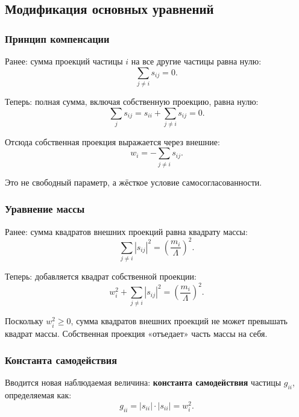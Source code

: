 \documentclass[12pt,a4paper]{article}
\begin{document}
\subsection{Модификация основных уравнений}

\subsubsection{Принцип компенсации}
Ранее: сумма проекций частицы $i$ на все другие частицы равна нулю:
\begin{equation}
    \sum_{j \neq i} s_{ij} = 0.
\end{equation}

Теперь: полная сумма, включая собственную проекцию, равна нулю:
\begin{equation}
    \sum_{j} s_{ij} = s_{ii} + \sum_{j \neq i} s_{ij} = 0.
\end{equation}

Отсюда собственная проекция выражается через внешние:
\begin{equation}
    \boxed{w_i = -\sum_{j \neq i} s_{ij}}.
\end{equation}

Это не свободный параметр, а жёсткое условие самосогласованности.

\subsubsection{Уравнение массы}
Ранее: сумма квадратов внешних проекций равна квадрату массы:
\begin{equation}
    \sum_{j \neq i} |s_{ij}|^2 = \left( \frac{m_i}{\Lambda} \right)^2.
\end{equation}

Теперь: добавляется квадрат собственной проекции:
\begin{equation}
    \boxed{w_i^2 + \sum_{j \neq i} |s_{ij}|^2 = \left( \frac{m_i}{\Lambda} \right)^2}.
\end{equation}

Поскольку $w_i^2 \geq 0$, сумма квадратов внешних проекций не может превышать квадрат массы. Собственная проекция «отъедает» часть массы на себя.

\subsubsection{Константа самодействия}
Вводится новая наблюдаемая величина: \textbf{константа самодействия} частицы $g_{ii}$, определяемая как:
\begin{equation}
    g_{ii} = |s_{ii}| \cdot |s_{ii}| = w_i^2.
\end{equation}
\end{document}
